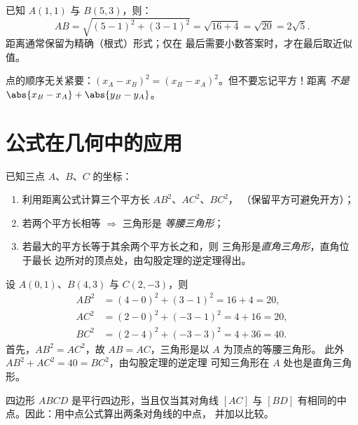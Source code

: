 \begin{example}\label{ex:g10:coordgeom:distance}
已知 $A(1, 1)$ 与 $B(5, 3)$，则：
\[
AB = \sqrt{(5-1)^2 + (3-1)^2} = \sqrt{16 + 4} = \sqrt{20} = 2\sqrt 5 .
\]
距离通常保留为精确（根式）形式；仅在
最后需要小数答案时，才在最后取近似值。
\end{example}

\begin{remark}
点的顺序无关紧要：$(x_A - x_B)^2 =
(x_B - x_A)^2$。但不要忘记平方！距离
\emph{不是} $\abs{x_B - x_A} + \abs{y_B - y_A}$。
\end{remark}

\section{公式在几何中的应用}

\begin{method}[三角形的形状]\label{met:g10:coordgeom:triangle}
已知三点 $A$、$B$、$C$ 的坐标：
\begin{enumerate}
  \item 利用距离公式计算三个平方长 $AB^2$、$AC^2$、$BC^2$，
        （保留平方可避免开方）；
  \item 若两个平方长相等 $\Rightarrow$ 三角形是
        \emph{等腰三角形}；
  \item 若最大的平方长等于其余两个平方长之和，则
        三角形是\emph{直角三角形}，直角位于最长
        边所对的顶点处，由勾股定理的逆定理得出。
\end{enumerate}
\end{method}

\begin{example}\label{ex:g10:coordgeom:triangle}
设 $A(0, 1)$、$B(4, 3)$ 与 $C(2, -3)$，则
\begin{align*}
AB^2 &= (4-0)^2 + (3-1)^2 = 16 + 4 = 20, \\
AC^2 &= (2-0)^2 + (-3-1)^2 = 4 + 16 = 20, \\
BC^2 &= (2-4)^2 + (-3-3)^2 = 4 + 36 = 40 .
\end{align*}
首先，$AB^2 = AC^2$，故 $AB = AC$，三角形是以 $A$ 为顶点的等腰三角形。
此外 $AB^2 + AC^2 = 40 = BC^2$，由勾股定理的逆定理
可知三角形在 $A$ 处也是直角三角形。
\end{example}

\begin{method}[判定平行四边形]\label{met:g10:coordgeom:parallelogram}
四边形 $ABCD$ 是平行四边形，当且仅当其对角线
$[AC]$ 与 $[BD]$ 有相同的中点。因此：用中点公式算出两条对角线的中点，
并加以比较。
\end{method}

